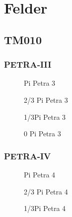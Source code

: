 \chapter{Felder}
\label{sec:appendix_felder}

\section{TM010}
\label{app:tm010_felder}

\subsection{PETRA-III}
\FloatBarrier
\begin{figure}[h]
  \centering
  
  \caption{Pi Petra 3}
\end{figure}

\begin{figure}[h]
  \centering
  
  \caption{2/3 Pi Petra 3}
\end{figure}

\begin{figure}[h]
  \centering
  
  \caption{1/3Pi Petra 3}
\end{figure}

\begin{figure}[h]
  \centering
  
  \caption{0 Pi Petra 3}
\end{figure}
\FloatBarrier

\subsection{PETRA-IV}
\FloatBarrier
\begin{figure}[h]
  \centering
  
  \caption{Pi Petra 4}
\end{figure}

\begin{figure}[h]
  \centering
  
  \caption{2/3 Pi Petra 4}
\end{figure}

\begin{figure}[h]
  \centering
  
  \caption{1/3Pi Petra 4}
\end{figure}

